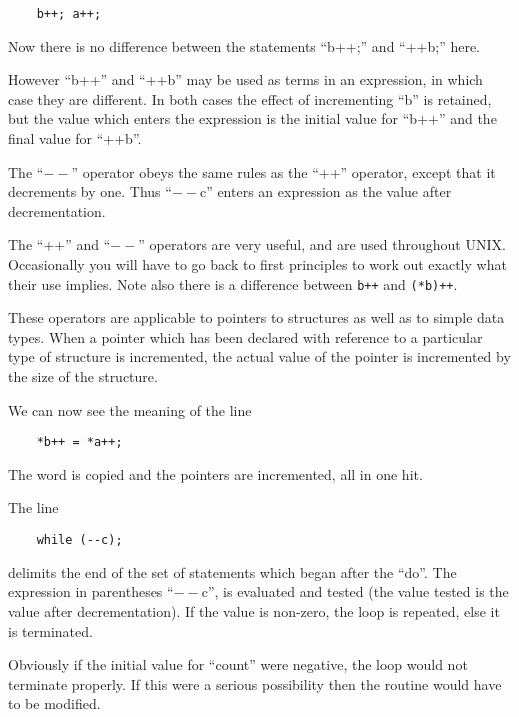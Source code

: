 \begin{verbatim}
    b++; a++;
\end{verbatim}

Now there is no difference between the
statements ``b++;'' and ``++b;'' here.

However ``b++'' and ``++b'' may be used as
terms in an expression, in which case
they are different. In both cases the
effect of incrementing ``b'' is retained,
but the value which enters the expression is
the initial value for ``b++'' and
the final value for ``++b''.

The ``$--$'' operator obeys the same rules
as the ``++'' operator, except that it
decrements by one. Thus ``$--$c'' enters an
expression as the value after decrementation.

The ``++'' and ``$--$'' operators are very
useful, and are used throughout UNIX.
Occasionally you will have to go back
to first principles to work out exactly
what their use implies. Note also
there is a difference between {\tt *b++} and {\tt (*b)++}.

These operators are applicable to
pointers to structures as well as to
simple data types. When a pointer
which has been declared with reference
to a particular type of structure is
incremented, the actual value of the
pointer is incremented by the size of
the structure.

\noindent We can now see the meaning of the line

\begin{verbatim}
    *b++ = *a++;
\end{verbatim}

\noindent The word is copied and the pointers are
incremented, all in one hit.

\noindent The line

\begin{verbatim}
    while (--c);
\end{verbatim}

\noindent delimits the end of the set of statements
which began after the ``do''. The
expression in parentheses ``$--$c'', is
evaluated and tested (the value tested
is the value after decrementation). If
the value is non-zero, the loop is
repeated, else it is terminated.

Obviously if the initial value for
``count'' were negative, the loop would
not terminate properly. If this were a
serious possibility then the routine
would have to be modified.


